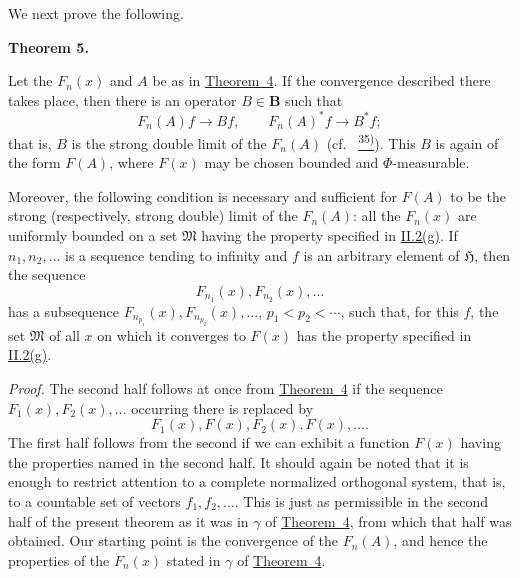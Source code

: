 \documentclass[12pt,b5paper,twoside]{article}
\newcommand{\noteref}[1]{%
  \hyperlink{note:#1}{\textsuperscript{#1)}}}
\begin{document}
We next prove the following.

\medskip
{}\label{thm:5}\noindent\textbf{Theorem 5.}
\begin{itshape}
Let the \(F_n(x)\) and \(A\) be as in
\hyperref[thm:4]{Theorem~4}.  If the convergence described there takes
place, then there is an operator \(B\in \mathbf B\) such that
\[
 F_n(A)f\longrightarrow Bf,
 \qquad F_n(A)^*f\longrightarrow B^*f;
\]
that is, \(B\) is the strong double limit of the \(F_n(A)\)
(cf.\ \noteref{35}).  This \(B\) is again of the form \(F(A)\), where
\(F(x)\) may be chosen bounded and \(\Phi\)-measurable.

Moreover, the following condition is necessary and sufficient for \(F(A)\)
to be the strong (respectively, strong double) limit of the \(F_n(A)\): all
the \(F_n(x)\) are uniformly bounded on a set \(\mathfrak M\) having the
property specified in \hyperref[prop:II.2.g]{II.2(g)}.  If
\(n_1,n_2,\ldots\) is a sequence tending to infinity and \(f\) is an
arbitrary element of \(\mathfrak H\), then the sequence
\[
 F_{n_1}(x),F_{n_2}(x),\ldots
\]
has a subsequence \(F_{n_{p_1}}(x),F_{n_{p_2}}(x),\ldots\),
\(p_1<p_2<\cdots\), such that, for this \(f\), the set \(\mathfrak M\) of
all \(x\) on which it converges to \(F(x)\) has the property specified in
\hyperref[prop:II.2.g]{II.2(g)}.
\end{itshape}

\noindent\textit{Proof.}
The second half follows at once from \hyperref[thm:4]{Theorem~4} if the
sequence \(F_1(x),\allowbreak F_2(x),\allowbreak\ldots\) occurring there is replaced by
\[
 F_1(x),F(x),F_2(x),F(x),\ldots.
\]
The first half follows from the second if we can exhibit a function \(F(x)\)
having the properties named in the second half.  It should again be noted
that it is enough to restrict attention to a complete normalized
orthogonal system, that is, to a countable set of vectors
\(f_1,f_2,\ldots\).  This is just as permissible in the second half of the
present theorem as it was in \hyperref[thm:4.gamma]{\(\gamma\)} of
\hyperref[thm:4]{Theorem~4}, from which that half was obtained.  Our
starting point is the convergence of the \(F_n(A)\), and hence the
properties of the \(F_n(x)\) stated in
\hyperref[thm:4.gamma]{\(\gamma\)} of
\hyperref[thm:4]{Theorem~4}.
\end{document}
